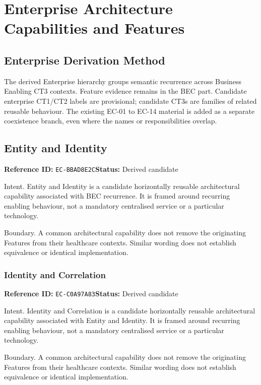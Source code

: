 \documentclass[11pt,a4paper,openany]{book}
\begin{document}
\part{Enterprise Architecture Capabilities and Features}
\chapter*{Enterprise Derivation Method}
The derived Enterprise hierarchy groups semantic recurrence across Business Enabling CT3 contexts. Feature evidence remains in the BEC part. Candidate enterprise CT1/CT2 labels are provisional; candidate CT3s are families of related reusable behaviour. The existing EC-01 to EC-14 material is added as a separate coexistence branch, even where the names or responsibilities overlap.

\chapter{Entity and Identity}\label{cap:ec-bbad8e2c}
\noindent\textbf{Reference ID:} \texttt{EC-BBAD8E2C}\quad \textbf{Status:} Derived candidate\par
Intent. Entity and Identity is a candidate horizontally reusable architectural capability associated with BEC recurrence. It is framed around recurring enabling behaviour, not a mandatory centralised service or a particular technology.

Boundary. A common architectural capability does not remove the originating Features from their healthcare contexts. Similar wording does not establish equivalence or identical implementation.

\section{Identity and Correlation}\label{cap:ec-c0a97a83}
\noindent\textbf{Reference ID:} \texttt{EC-C0A97A83}\quad \textbf{Status:} Derived candidate\par
Intent. Identity and Correlation is a candidate horizontally reusable architectural capability associated with Entity and Identity. It is framed around recurring enabling behaviour, not a mandatory centralised service or a particular technology.

Boundary. A common architectural capability does not remove the originating Features from their healthcare contexts. Similar wording does not establish equivalence or identical implementation.
\end{document}
